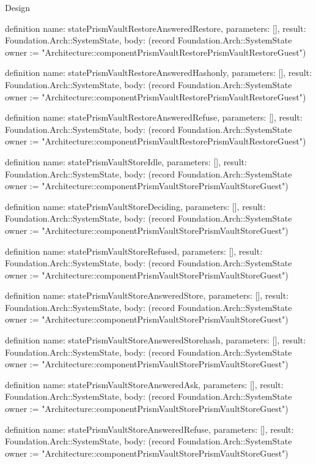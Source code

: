 \begin{lexlean}{Design}
\begin{semanticmodule}
definition{
  name: statePrismVaultRestoreAnsweredRestore,
  parameters: [],
  result: Foundation.Arch::SystemState,
  body: (record Foundation.Arch::SystemState {owner := "Architecture::componentPrismVaultRestorePrismVaultRestoreGuest"})
}

definition{
  name: statePrismVaultRestoreAnsweredHashonly,
  parameters: [],
  result: Foundation.Arch::SystemState,
  body: (record Foundation.Arch::SystemState {owner := "Architecture::componentPrismVaultRestorePrismVaultRestoreGuest"})
}

definition{
  name: statePrismVaultRestoreAnsweredRefuse,
  parameters: [],
  result: Foundation.Arch::SystemState,
  body: (record Foundation.Arch::SystemState {owner := "Architecture::componentPrismVaultRestorePrismVaultRestoreGuest"})
}

definition{
  name: statePrismVaultStoreIdle,
  parameters: [],
  result: Foundation.Arch::SystemState,
  body: (record Foundation.Arch::SystemState {owner := "Architecture::componentPrismVaultStorePrismVaultStoreGuest"})
}

definition{
  name: statePrismVaultStoreDeciding,
  parameters: [],
  result: Foundation.Arch::SystemState,
  body: (record Foundation.Arch::SystemState {owner := "Architecture::componentPrismVaultStorePrismVaultStoreGuest"})
}

definition{
  name: statePrismVaultStoreRefused,
  parameters: [],
  result: Foundation.Arch::SystemState,
  body: (record Foundation.Arch::SystemState {owner := "Architecture::componentPrismVaultStorePrismVaultStoreGuest"})
}

definition{
  name: statePrismVaultStoreAnsweredStore,
  parameters: [],
  result: Foundation.Arch::SystemState,
  body: (record Foundation.Arch::SystemState {owner := "Architecture::componentPrismVaultStorePrismVaultStoreGuest"})
}

definition{
  name: statePrismVaultStoreAnsweredStorehash,
  parameters: [],
  result: Foundation.Arch::SystemState,
  body: (record Foundation.Arch::SystemState {owner := "Architecture::componentPrismVaultStorePrismVaultStoreGuest"})
}

definition{
  name: statePrismVaultStoreAnsweredAsk,
  parameters: [],
  result: Foundation.Arch::SystemState,
  body: (record Foundation.Arch::SystemState {owner := "Architecture::componentPrismVaultStorePrismVaultStoreGuest"})
}

definition{
  name: statePrismVaultStoreAnsweredRefuse,
  parameters: [],
  result: Foundation.Arch::SystemState,
  body: (record Foundation.Arch::SystemState {owner := "Architecture::componentPrismVaultStorePrismVaultStoreGuest"})
}


\end{semanticmodule}
\end{lexlean}
